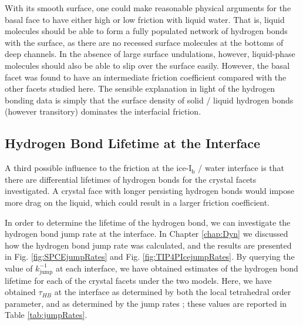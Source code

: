 With its smooth surface, one could make reasonable physical arguments
for the basal face to have either high or low friction with liquid
water. That is, liquid molecules should be able to form a fully
populated network of hydrogen bonds with the surface, as there are no
recessed surface molecules at the bottoms of deep channels. In the
absence of large surface undulations, however, liquid-phase molecules
should also be able to slip over the surface easily. However, the
basal facet was found to have an intermediate friction coefficient
compared with the other facets studied here. The sensible explanation
in light of the hydrogen bonding data is simply that the surface
density of solid / liquid hydrogen bonds (however transitory)
dominates the interfacial friction.

\subsection{Hydrogen Bond Lifetime at the Interface}
A third possible influence to the friction at the ice-I$_\mathrm{h}$ /
water interface is that there are differential lifetimes of hydrogen
bonds for the crystal facets investigated. A crystal face with longer
persisting hydrogen bonds would impose more drag on the liquid, which
could result in a larger friction coefficient. 

In order to determine the lifetime of the hydrogen bond, we can
investigate the hydrogen bond jump rate at the interface. In Chapter
\ref{chap:Dyn} we discussed how the hydrogen bond jump rate was
calculated, and the results are presented in
Fig. \ref{fig:SPCEjumpRates} and Fig. \ref{fig:TIP4PIcejumpRates}. By
querying the value of $k_\mathrm{jump}^{-1}$ at each interface, we
have obtained estimates of the hydrogen bond lifetime for each of the
crystal facets under the two models. Here, we have obtained
$\tau_{HB}$ at the interface as determined by both the local
tetrahedral order parameter, and as determined by the jump rates ;
these values are reported in Table \ref{tab:jumpRates}.


